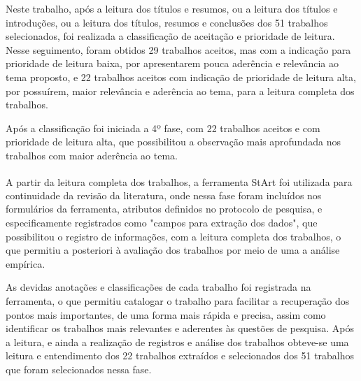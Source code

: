 Neste trabalho, após a leitura dos títulos e resumos, ou a leitura dos títulos e introduções, ou a leitura dos títulos, resumos e conclusões dos 51 trabalhos selecionados, foi realizada a classificação de aceitação e prioridade de leitura. Nesse seguimento, foram obtidos 29 trabalhos aceitos, mas com a indicação para prioridade de leitura baixa, por apresentarem pouca aderência e relevância ao tema proposto, e 22 trabalhos aceitos com indicação de prioridade de leitura alta, por possuírem, maior relevância e aderência ao tema, para a leitura completa dos trabalhos.   

Após a classificação foi iniciada a 4º fase, com 22 trabalhos aceitos e com prioridade de leitura alta, que possibilitou a observação mais aprofundada nos trabalhos com maior aderência ao tema. 

A partir da leitura completa dos trabalhos, a ferramenta \acrshort{StArt}\textsuperscript{\textregistered} foi utilizada para continuidade da revisão da literatura, onde nessa fase foram incluídos nos formulários da ferramenta, atributos definidos no protocolo de pesquisa, e especificamente registrados como "campos para extração dos dados", que possibilitou o registro de informações, com a leitura completa dos trabalhos, o  que permitiu a posteriori à avaliação dos trabalhos por meio de uma a análise empírica. 

As devidas anotações e classificações de cada trabalho foi registrada na ferramenta, o que permitiu catalogar o trabalho para facilitar a recuperação dos pontos mais importantes, de uma forma mais rápida e precisa, assim como identificar os trabalhos mais relevantes e aderentes às questões de pesquisa. Após a leitura, e ainda a realização de registros e análise dos trabalhos obteve-se uma leitura e entendimento dos 22 trabalhos extraídos e selecionados dos 51 trabalhos que foram selecionados nessa fase. 

\vspace{30mm}

